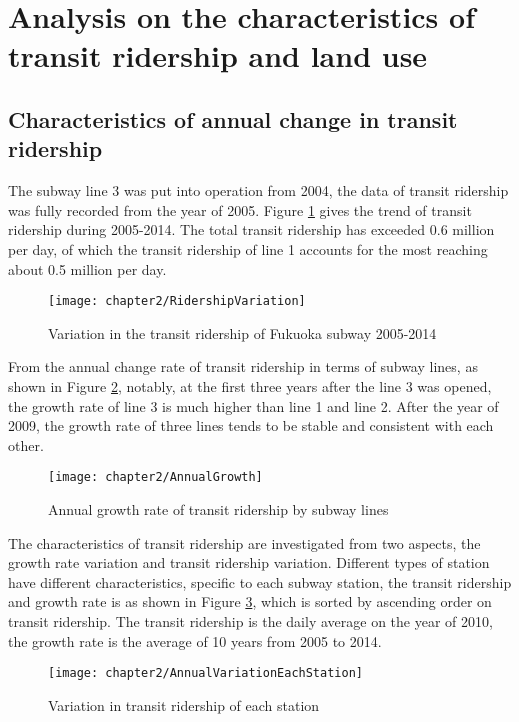 %
\section{Analysis on the characteristics of transit ridership and land use}
%
\subsection{Characteristics of annual change in transit ridership}
%
The subway line 3 was put into operation from 2004, the data of transit ridership was fully recorded from the year of 2005. Figure \ref{fig:chp2:RidershipVariation} gives the trend of transit ridership during 2005-2014. The total transit ridership has exceeded 0.6 million per day, of which the transit ridership of line 1 accounts for the most reaching about 0.5 million per day.

\begin{figure}[htbp]
	\centering
	\texttt{[image: chapter2/RidershipVariation]}
	\caption{Variation in the transit ridership of Fukuoka subway 2005-2014}
	\label{fig:chp2:RidershipVariation}
\end{figure}

%
From the annual change rate of transit ridership in terms of subway lines, as shown in Figure \ref{fig:chp2:AnnualGrowth}, notably, at the first three years after the line 3 was opened, the growth rate of line 3 is much higher than line 1 and line 2. After the year of 2009, the growth rate of three lines tends to be stable and consistent with each other.

%
\begin{figure}[htbp]
	\centering
	\texttt{[image: chapter2/AnnualGrowth]}
	\caption{Annual growth rate of transit ridership by subway lines}
	\label{fig:chp2:AnnualGrowth}
\end{figure}

%
The characteristics of transit ridership are investigated from two aspects, the growth rate variation and transit ridership variation. Different types of station have different characteristics, specific to each subway station, the transit ridership and growth rate is as shown in Figure \ref{fig:chp2:AnnualVariationEachStation}, which is sorted by ascending order on transit ridership. The transit ridership is the daily average on the year of 2010, the growth rate is the average of 10 years from 2005 to 2014. 

%
\begin{figure}[htbp]
	\centering
	\texttt{[image: chapter2/AnnualVariationEachStation]}
	\caption{Variation in transit ridership of each station}
	\label{fig:chp2:AnnualVariationEachStation}
\end{figure}

